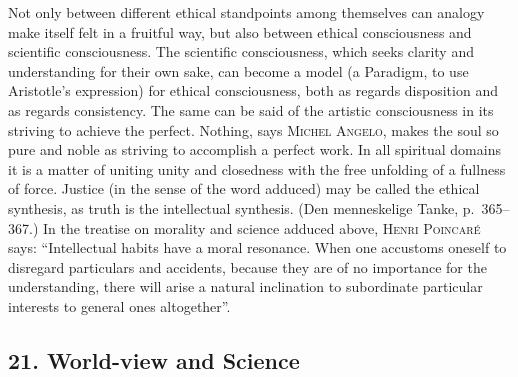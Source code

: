 \documentclass[12pt]{book}
\newcommand{\opage}[1]{\marginnote{\footnotesize\textit{[#1]}}}
\begin{document}
Not only between different ethical standpoints among themselves can analogy make
itself felt in a fruitful way, but also between ethical consciousness and
scientific \opage{124}consciousness. The scientific consciousness, which seeks clarity and
understanding for their own sake, can become a model (a Paradigm, to use
Aristotle's expression) for ethical consciousness, both as regards disposition and
as regards consistency. The same can be said of the artistic consciousness in its
striving to achieve the perfect. Nothing, says \textsc{Michel Angelo}, makes the
soul so pure and noble as striving to accomplish a perfect work. In all spiritual
domains it is a matter of uniting unity and closedness with the free unfolding of
a fullness of force. Justice (in the sense of the word adduced) may be called the
ethical synthesis, as truth is the intellectual synthesis. (Den menneskelige
Tanke, p.\ 365--367.) In the treatise on morality and science adduced above,
\textsc{Henri Poincaré} says: ``Intellectual habits have a moral resonance. When
one accustoms oneself to disregard particulars and accidents, because they are of
no importance for the understanding, there will arise a natural inclination to
subordinate particular interests to general ones altogether''.

\subsection*{21. World-view and Science}
\end{document}
